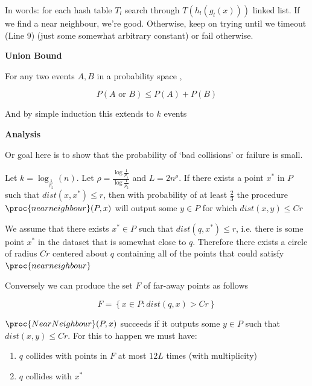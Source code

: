 \documentclass[../notes.tex]{subfiles}
\begin{document}
In words: for each hash table $ T_l $ search through $ T(h_l(g_l(x))) $ linked list. If we find a near neighbour, we're good. Otherwise, keep on trying until we timeout (Line 9) (just some somewhat arbitrary constant) or fail otherwise.


\begin{definition}
    \textbf{Union Bound} 

    For any two events $ A, B $ in a probability space ,

    \begin{equation}
        P(A \text{ or } B) \le   P(A) + P(B) 
    \end{equation}

    And by simple induction this extends to $ k $ events
\end{definition}



\textbf{Analysis} 

Or goal here is to show that the probability of `bad collisions' or failure is small.

\begin{theorem}

    Let $ k = \log_{\frac{1}{p_2}}(n)$. Let $ \rho = \frac{\log \frac{1}{p_1}}{\log \frac{1}{p_2}} $ and $ L = 2n^{\rho} $. 
    If there exists a point  $ x^* $ in $ P $ such that $ dist(x, x^*) \le r  $, then with probability of at least $ \frac{2}{3} $ the procedure $ \proc{nearneighbour}(P, x) $ will output some $ y \in P $ for which $ dist(x,y) \le Cr $

\end{theorem}

We assume that there exists $ x^* \in P  $ such that $ dist(q, x^*) \le r $, i.e. there is some point $ x^* $ in the dataset that is somewhat close to $ q $.
Therefore there exists a circle of radius $ Cr $ centered about $ q $ containing all of the points that could satisfy $ \proc{nearneighbour} $

Conversely we can produce the set $ F $ of far-away points as follows

\begin{equation}
    F = \left\{ x \in P: dist(q, x) > Cr \right\} 
\end{equation}


$ \proc{NearNeighbour}(P, x) $ succeeds if it outputs some $ y \in P  $ such that $ dist(x,y) \le  Cr $. For this to happen we must have:

\begin{enumerate}
    \item $ q $ collides with points in $ F $ at most $  12L $  times (with multiplicity)
    \item $ q $ collides with $ x^* $
\end{enumerate}
\end{document}
